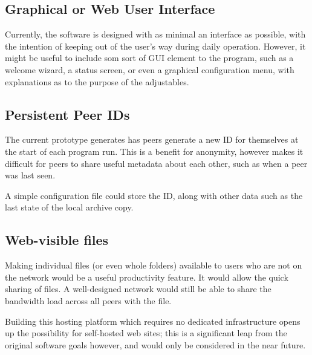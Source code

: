 \documentclass[12pt,a4paper,]{adreport}
\begin{document}
\subsection{Graphical or Web User
Interface}\label{graphical-or-web-user-interface}

Currently, the software is designed with as minimal an interface as possible, with the intention of keeping out of the user's way during daily operation. However, it might be useful to include som sort of GUI element to the program, such as a welcome wizard, a status screen, or even a graphical configuration menu, with explanations as to the purpose of the adjustables.

\subsection{Persistent Peer IDs}\label{persistent-peer-ids}

The current prototype generates has peers generate a new ID for themselves at the start of each program run. This is a benefit for anonymity, however makes it difficult for peers to share useful metadata about each other, such as when a peer was last seen.

A simple configuration file could store the ID, along with other data such as the last state of the local archive copy.

\subsection{Web-visible files}\label{web-visible-files}

Making individual files (or even whole folders) available to users who are not on the network would be a useful productivity feature. It would allow the quick sharing of files. A well-designed network would still be able to share the bandwidth load across all peers with the file.

Building this hosting platform which requires no dedicated infrastructure opens up the possibility for self-hosted web sites; this is a significant leap from the original software goals however, and would only be considered in the near future.
\end{document}
